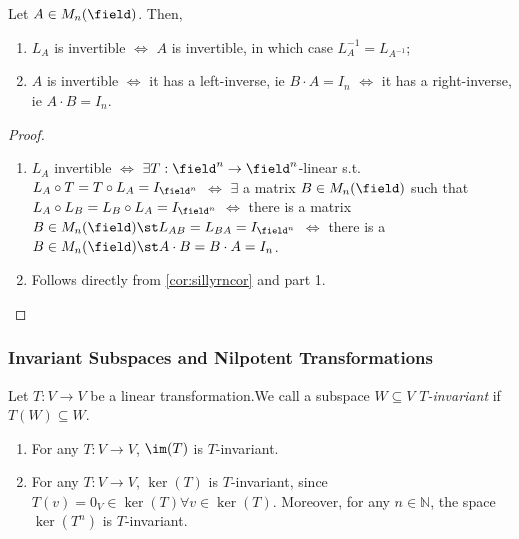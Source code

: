 \begin{proposition}
    Let $A \in M_n(\field)$. Then, \begin{enumerate}
        \item $L_A$ is invertible $\iff$ $A$ is invertible, in which case $L_A^{-1} = L_{A^{-1}}$;
        \item $A$ is invertible $\iff$ it has a left-inverse, ie $B \cdot A = I_n$ $\iff$ it has a right-inverse, ie $A \cdot B = I_n$.
    \end{enumerate}
\end{proposition}

\begin{proof}
    \begin{enumerate}
        \item $L_A$ invertible $\iff$ $\exists T:\field^n \to \field^n$-linear s.t. $L_A \circ T = T \circ L_A = I_{\field^n}$ $\iff$ $\exists$ a matrix $B \in M_n(\field)$ such that $L_A \circ L_B = L_B \circ L_A = I_{\field^n}$ $\iff$ there is a matrix $B \in M_n(\field) \st L_{AB} = L_{BA} = I_{\field^n}$ $\iff$ there is a $B \in M_{n}(\field) \st A \cdot B = B \cdot A = I_n$.
        \item Follows directly from \cref{cor:sillyrncor} and part 1.
    \end{enumerate}
\end{proof}

\subsubsection{Invariant Subspaces and Nilpotent Transformations}

\begin{definition}[$T$-Invariant]
    Let $T : V \to V$ be a linear transformation.\footnotemark We call a subspace $W \subseteq V$ \emph{$T$-invariant} if $T(W) \subseteq W$.
\end{definition}
\begin{example}
    \begin{enumerate}
        \item For any $T : V \to V$, $\im(T)$ is $T$-invariant.
        \item For any $T:V \to V$, $\ker(T)$ is $T$-invariant, since $T(v) = 0_V \in \ker(T) \forall v \in \ker(T)$. Moreover, for any $n \in \mathbb{N}$, the space $\ker(T^n)$ is $T$-invariant.\footnotemark 
    \end{enumerate}
\end{example}

